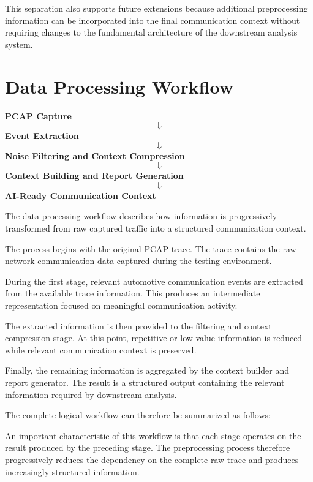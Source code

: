 This separation also supports future extensions because additional preprocessing information can be incorporated into the final communication context without requiring changes to the fundamental architecture of the downstream analysis system.

\section{Data Processing Workflow}
\begin{center}
\textbf{PCAP Capture}
\[
\Downarrow
\]
\textbf{Event Extraction}
\[
\Downarrow
\]
\textbf{Noise Filtering and Context Compression}
\[
\Downarrow
\]
\textbf{Context Building and Report Generation}
\[
\Downarrow
\]
\textbf{AI-Ready Communication Context}
\end{center}
The data processing workflow describes how information is progressively transformed from raw captured traffic into a structured communication context.

The process begins with the original PCAP trace. The trace contains the raw network communication data captured during the testing environment.

During the first stage, relevant automotive communication events are extracted from the available trace information. This produces an intermediate representation focused on meaningful communication activity.

The extracted information is then provided to the filtering and context compression stage. At this point, repetitive or low-value information is reduced while relevant communication context is preserved.

Finally, the remaining information is aggregated by the context builder and report generator. The result is a structured output containing the relevant information required by downstream analysis.

The complete logical workflow can therefore be summarized as follows:



An important characteristic of this workflow is that each stage operates on the result produced by the preceding stage. The preprocessing process therefore progressively reduces the dependency on the complete raw trace and produces increasingly structured information.

